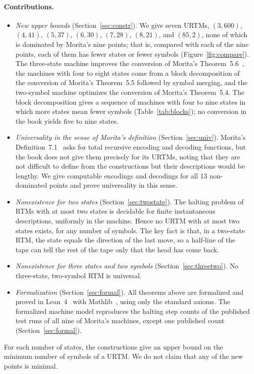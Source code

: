 \documentclass{article}
\theoremstyle{definition}
\theoremstyle{remark}
\begin{document}
\paragraph{Contributions.}
\begin{itemize}
\item \emph{New upper bounds} (Section~\ref{sec:constr}).
We give seven URTMs, $(3,600)$, $(4,41)$, $(5,37)$, $(6,30)$, $(7,28)$, $(8,21)$, and $(85,2)$, none of which is dominated by Morita's nine points; that is, compared with each of the nine points, each of them has fewer states or fewer symbols (Figure~\ref{fig:compare}).
The three-state machine improves the conversion of Morita's Theorem~5.6~\cite{Morita17}, the machines with four to eight states come from a block decomposition of the conversion of Morita's Theorem~5.5 followed by symbol merging, and the two-symbol machine optimizes the conversion of Morita's Theorem~5.4.
The block decomposition gives a sequence of machines with four to nine states in which more states mean fewer symbols (Table~\ref{tab:blocks}); no conversion in the book yields five to nine states.
\item \emph{Universality in the sense of Morita's definition} (Section~\ref{sec:univ}).
Morita's Definition~7.1~\cite{Morita17} asks for total recursive encoding and decoding functions, but the book does not give them precisely for its URTMs, noting that they are not difficult to define from the constructions but their descriptions would be lengthy.
We give computable encodings and decodings for all 13 non-dominated points and prove universality in this sense.
\item \emph{Nonexistence for two states} (Section~\ref{sec:twostate}).
The halting problem of RTMs with at most two states is decidable for finite instantaneous descriptions, uniformly in the machine.
Hence no URTM with at most two states exists, for any number of symbols.
The key fact is that, in a two-state RTM, the state equals the direction of the last move, so a half-line of the tape can tell the rest of the tape only that the head has come back.
\item \emph{Nonexistence for three states and two symbols} (Section~\ref{sec:threetwo}).
No three-state, two-symbol RTM is universal.
\item \emph{Formalization} (Section~\ref{sec:formal}).
All theorems above are formalized and proved in Lean~4~\cite{Lean4} with Mathlib~\cite{Mathlib20}, using only the standard axioms.
The formalized machine model reproduces the halting step counts of the published test runs of all nine of Morita's machines, except one published count (Section~\ref{sec:formal}).
\end{itemize}
For each number of states, the constructions give an upper bound on the minimum number of symbols of a URTM. We do not claim that any of the new points is minimal.
\end{document}

